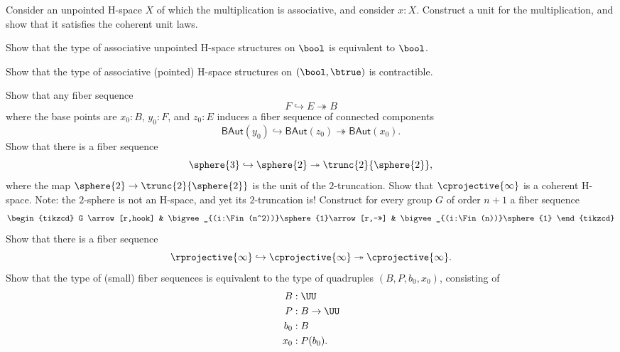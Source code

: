 \begin{exercises}
  \exercise Consider an unpointed H-space $X$ of which the multiplication is associative, and consider $x:X$. Construct a unit for the multiplication, and show that it satisfies the coherent unit laws.
  \exercise
  \begin{subexenum}
  \item Show that the type of associative unpointed H-space structures on $\bool$ is equivalent to $\bool$.
  \item Show that the type of associative (pointed) H-space structures on $(\bool,\btrue)$ is contractible.
  \end{subexenum}
  \exercise Show that any fiber sequence
\begin{equation*}
  F \hookrightarrow E \twoheadrightarrow B
\end{equation*}
where the base points are $x_0:B$, $y_0:F$, and $z_0:E$ induces a fiber sequence of connected components
\begin{equation*}
  \mathsf{BAut}(y_0) \hookrightarrow \mathsf{BAut}(z_0) \twoheadrightarrow \mathsf{BAut}(x_0).
\end{equation*}
  \exercise Show that there is a fiber sequence
\begin{equation*}
  \sphere{3}\hookrightarrow\sphere{2}\twoheadrightarrow\trunc{2}{\sphere{2}},
\end{equation*}
where the map $\sphere{2}\to\trunc{2}{\sphere{2}}$ is the unit of the $2$-truncation.
  \exercise Show that $\cprojective{\infty}$ is a coherent H-space. Note: the $2$-sphere is not an H-space, and yet its $2$-truncation is!
  \exercise Construct for every group $G$ of order $n+1$ a fiber sequence
  \begin{equation*}
    \begin{tikzcd}
      G \arrow[r,hook] & \bigvee_{(i:\Fin(n^2))}\sphere{1}\arrow[r,->>] & \bigvee_{(i:\Fin(n))}\sphere{1}
    \end{tikzcd}
  \end{equation*}
  \exercise Show that there is a fiber sequence
\begin{equation*}
  \rprojective{\infty}\hookrightarrow\cprojective{\infty}\twoheadrightarrow\cprojective{\infty}.
\end{equation*}
\exercise Show that the type of (small) fiber sequences is equivalent to the type of quadruples $(B,P,b_0,x_0)$, consisting of
\begin{align*}
B & : \UU \\
P & : B \to \UU \\
b_0 & : B \\
x_0 & : P(b_0).
\end{align*}
\end{exercises}
